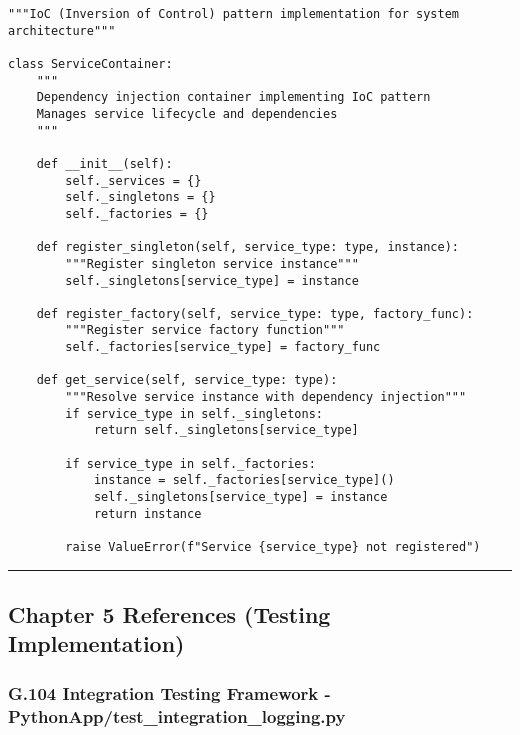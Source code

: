 \documentclass[11pt,a4paper]{article}
\begin{document}
\begin{verbatim}
"""IoC (Inversion of Control) pattern implementation for system architecture"""

class ServiceContainer:
    """
    Dependency injection container implementing IoC pattern
    Manages service lifecycle and dependencies
    """

    def __init__(self):
        self._services = {}
        self._singletons = {}
        self._factories = {}

    def register_singleton(self, service_type: type, instance):
        """Register singleton service instance"""
        self._singletons[service_type] = instance

    def register_factory(self, service_type: type, factory_func):
        """Register service factory function"""
        self._factories[service_type] = factory_func

    def get_service(self, service_type: type):
        """Resolve service instance with dependency injection"""
        if service_type in self._singletons:
            return self._singletons[service_type]

        if service_type in self._factories:
            instance = self._factories[service_type]()
            self._singletons[service_type] = instance
            return instance

        raise ValueError(f"Service {service_type} not registered")
\end{verbatim}

\hrule

\subsection{Chapter 5 References (Testing Implementation)}

\subsubsection{G.104 Integration Testing Framework - PythonApp/test_integration_logging.py}
\end{document}
